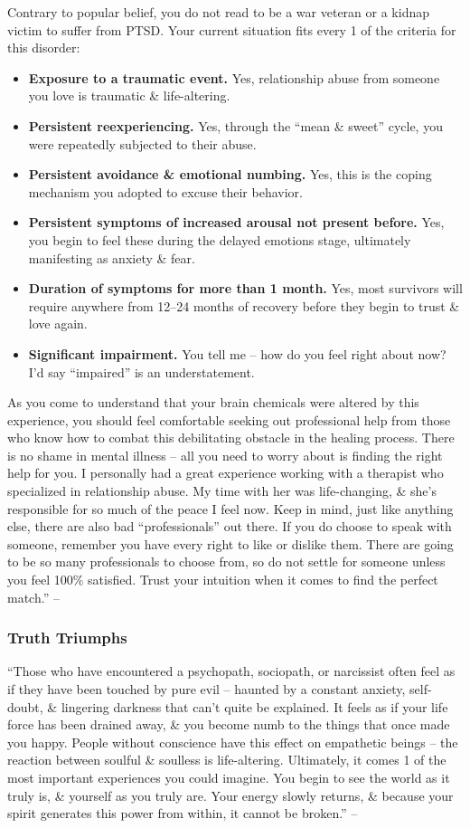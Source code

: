\documentclass{article}
\numberwithin{equation}{section}
\begin{document}
Contrary to popular belief, you do not read to be a war veteran or a kidnap victim to suffer from PTSD. Your current situation fits every 1 of the criteria for this disorder:
\begin{itemize}
	\item \textbf{Exposure to a traumatic event.} Yes, relationship abuse from someone you love is traumatic \& life-altering.
	\item \textbf{Persistent reexperiencing.} Yes, through the ``mean \& sweet'' cycle, you were repeatedly subjected to their abuse.
	\item \textbf{Persistent avoidance \& emotional numbing.} Yes, this is the coping mechanism you adopted to excuse their behavior.
	\item \textbf{Persistent symptoms of increased arousal not present before.} Yes, you begin to feel these during the delayed emotions stage, ultimately manifesting as anxiety \& fear.
	\item \textbf{Duration of symptoms for more than 1 month.} Yes, most survivors will require anywhere from 12--24 months of recovery before they begin to trust \& love again.
	\item \textbf{Significant impairment.} You tell me -- how do you feel right about now? I'd say ``impaired'' is an understatement.
\end{itemize}
As you come to understand that your brain chemicals were altered by this experience, you should feel comfortable seeking out professional help from those who know how to combat this debilitating obstacle in the healing process. There is no shame in mental illness -- all you need to worry about is finding the right help for you. I personally had a great experience working with a therapist who specialized in relationship abuse. My time with her was life-changing, \& she's responsible for so much of the peace I feel now. Keep in mind, just like anything else, there are also bad ``professionals'' out there. If you do choose to speak with someone, remember you have every right to like or dislike them. There are going to be so many professionals to choose from, so do not settle for someone unless you feel 100\% satisfied. Trust your intuition when it comes to find the perfect match.'' -- \cite[pp. 126--129]{MacKenzie2015}

\subsubsection{Truth Triumphs}
``Those who have encountered a psychopath, sociopath, or narcissist often feel as if they have been touched by pure evil -- haunted by a constant anxiety, self-doubt, \& lingering darkness that can't quite be explained. It feels as if your life force has been drained away, \& you become numb to the things that once made you happy. People without conscience have this effect on empathetic beings -- the reaction between soulful \& soulless is life-altering. Ultimately, it comes 1 of the most important experiences you could imagine. You begin to see the world as it truly is, \& yourself as you truly are. Your energy slowly returns, \& because your spirit generates this power from within, it cannot be broken.'' -- \cite[p. 129]{MacKenzie2015}
\end{document}
